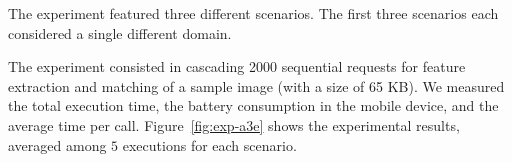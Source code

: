The experiment featured three different scenarios. The first three scenarios each considered a single different domain. 

The experiment consisted in cascading 2000 sequential requests for feature extraction and matching of a sample image (with a size of 65 KB). We measured the total execution time, the battery consumption in the mobile device, and the average time per call. Figure~\ref{fig:exp-a3e} shows the experimental results, averaged among $5$ executions for each scenario.

